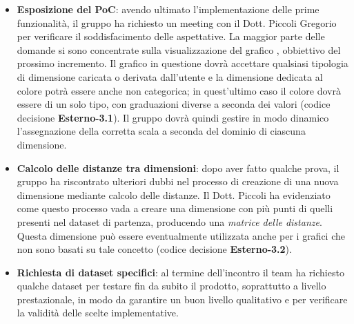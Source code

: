 \begin{itemize}

\item \textbf{Esposizione del PoC}: avendo ultimato l'implementazione delle prime funzionalità, il gruppo ha richiesto un meeting con il Dott. Piccoli Gregorio per verificare il soddisfacimento delle aspettative. La maggior parte delle domande si sono concentrate sulla visualizzazione del grafico \textit{}, obbiettivo del prossimo incremento. Il grafico in questione dovrà accettare qualsiasi tipologia di dimensione caricata o derivata dall'utente e la dimensione dedicata al colore potrà essere anche non categorica; in quest'ultimo caso il colore dovrà essere di un solo tipo, con graduazioni diverse a seconda dei valori (codice decisione \textbf{Esterno-3.1}). Il gruppo dovrà quindi gestire in modo dinamico l'assegnazione della corretta scala a seconda del dominio di ciascuna dimensione.

\item \textbf{Calcolo delle distanze tra dimensioni}: dopo aver fatto qualche prova, il gruppo ha riscontrato ulteriori dubbi nel processo di creazione di una nuova dimensione mediante calcolo delle distanze. Il Dott. Piccoli ha evidenziato come questo processo vada a creare una dimensione con più punti di quelli presenti nel dataset di partenza, producendo una \textit{matrice delle distanze}. Questa dimensione può essere eventualmente utilizzata anche per i grafici che non sono basati su tale concetto (codice decisione \textbf{Esterno-3.2}).

\item \textbf{Richiesta di dataset specifici}: al termine dell'incontro il team ha richiesto qualche dataset per testare fin da subito il prodotto, soprattutto a livello prestazionale, in modo da garantire un buon livello qualitativo e per verificare la validità delle scelte implementative.  

\end{itemize}